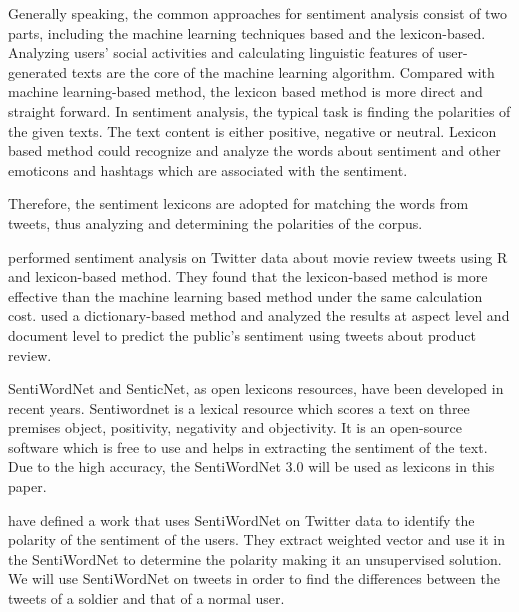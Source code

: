 Generally speaking, the common approaches for sentiment analysis consist of two parts, including the machine learning techniques based and the lexicon-based. Analyzing users' social activities and calculating linguistic features of user-generated texts are the core of the machine learning algorithm. Compared with machine learning-based method, the lexicon based method is more direct and straight forward. In sentiment analysis, the typical task is finding the polarities of the given texts. The text content is either positive, negative or neutral. Lexicon based method could recognize and analyze the words about sentiment and other emoticons and hashtags which are associated with the sentiment.

Therefore, the sentiment lexicons are adopted for matching the words from tweets, thus analyzing and determining the polarities of the corpus.

\cite{azizan2019lexicon} performed sentiment analysis on Twitter data about movie review tweets using R and lexicon-based method. They found that the lexicon-based method is more effective than the machine learning based method under the same calculation cost. \cite{8073512} used a dictionary-based method and analyzed the results at aspect level and document level to predict the public’s sentiment using tweets about product review.

SentiWordNet and SenticNet, as open lexicons resources, have been developed in recent years. Sentiwordnet is a lexical resource which scores a text on three premises object, positivity, negativity and objectivity. It is an open-source software which is free to use and helps in extracting the sentiment of the text. Due to the high accuracy, the SentiWordNet 3.0 \citep{baccianella2010sentiwordnet} will be used as lexicons in this paper.

\cite{montejo2012random} have defined a work that uses SentiWordNet on Twitter data to identify the polarity of the sentiment of the users. They extract weighted vector and use it in the SentiWordNet to determine the polarity making it an unsupervised solution. We will use SentiWordNet on tweets in order to find the differences between the tweets of a soldier and that of a normal user.
